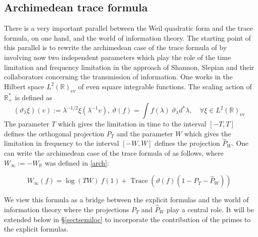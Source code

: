 \documentclass{article}
\def\R{{\mathbb R}}
\begin{document}
\subsection{Archimedean trace formula} 
There is a very important  parallel between the Weil quadratic form and the trace formula, on one hand, and the  world of information theory. The starting point of this parallel is to rewrite the archimedean case of the  trace formula of \cite{Co-zeta} by involving now two independent parameters which play the role of the time limitation and frequency limitation in the approach of Shannon, Slepian and their  collaborators concerning the transmission of information. One works in the Hilbert space $L^2(\mathbb{R})_{\mathrm{ev}}$ of even square integrable functions. The scaling action of $\mathbb{R}_{+}^*$ is defined as  
$$(\vartheta_\lambda \xi)(v):=\lambda^{-1 / 2} \xi\left(\lambda^{-1} v\right), \ \vartheta(f)=\int f(\lambda) \ \vartheta_\lambda d^*\lambda, \quad \forall \xi \in L^2(\mathbb{R})_{\mathrm{ev}}$$
The parameter $T$ which gives the limitation in time to the interval $[-T,T]$ defines the orthogonal projection $P_T$ and the parameter $W$ which gives the limitation in frequency to the interval $[-W,W]$ defines the projection $\widehat P_W$. One can write the archimedean case of the  trace formula of \cite{Co-zeta} as follows, where $W_\infty:=-W_\R$ was defined in \eqref{arch}:
 \begin{graybox}
 \begin{equation}\label{weilq}
 		W_\infty(f)= \log( TW)\ f(1)+\operatorname{Trace}\left(\vartheta(f)\left(1-P_T-\widehat P_W\right)		\right)
 			\end{equation}
 			\end{graybox}   
We view this formula as a bridge between the explicit formulas and the world of information theory where the projections $P_T$ and $\widehat P_W$ play a central role. It will be extended below in \S \ref{sectsemiloc} to incorporate the contribution of the primes to the explicit formulas. 
\end{document}
